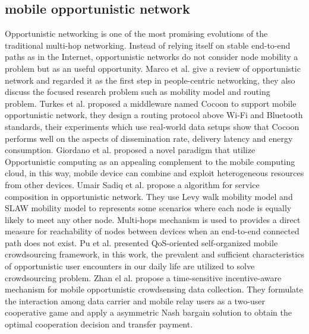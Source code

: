 \documentclass[10pt,journal,compsoc]{IEEEtran}
\begin{document}
\subsection{mobile opportunistic network}
Opportunistic networking is one of the most promising evolutions of the traditional multi-hop networking. 
Instead of relying itself on stable end-to-end paths as in the Internet, opportunistic networks do not consider node mobility a problem but as an useful opportunity. 
Marco et al. \cite{Conti2014} give a review of opportunistic network and regarded it as the first step in people-centric networking, they also discuss the focused research problem such as mobility model and routing problem.
Turkes et al. \cite{turkes2016cocoon} proposed a middleware named Cocoon to support mobile opportunistic network, they design a routing protocol above Wi-Fi and Bluetooth standards, their experiments which use real-world data setups show that Cocoon performs well on the aspects of dissemination rate, delivery latency and energy consumption.
Giordano et al. \cite{giordano2011human} proposed a novel paradigm that utilize Opportunistic computing as an appealing complement to the mobile computing cloud, in this way, mobile device can combine and exploit heterogeneous resources from other devices.
Umair Sadiq et al. \cite{sadiq2015service} propose a algorithm for service composition in opportunistic network. They use Levy walk mobility model and SLAW mobility model to represents some scenarios where each node is equally likely to meet any other node. Multi-hops mechanism is used to provides a direct measure for reachability of nodes between devices when an end-to-end connected path does not exist.
Pu et al. \cite{Pu2017crowd} presented QoS-oriented self-organized mobile crowdsourcing framework, in this work, the prevalent and sufficient characteristics of opportunistic user encounters in our daily life are utilized to solve crowdsourcing problem.
Zhan el al. \cite{zhan2017time} propose a time-sensitive incentive-aware mechanism for mobile opportunistic crowdsensing data collection. They formulate the interaction among data carrier and mobile relay users as a two-user cooperative game and apply a asymmetric Nash bargain solution to obtain the optimal cooperation decision and transfer payment.
\end{document}
